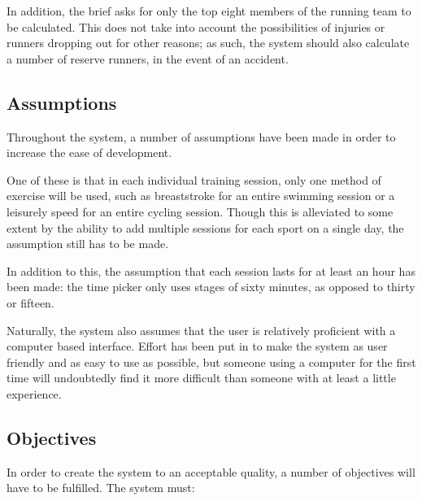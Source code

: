 \documentclass{article}[12pt,a4paper]
\begin{document}
In addition, the brief asks for only the top eight members of the running team to be calculated. This does not take into account the possibilities of injuries or runners dropping out for other reasons; as such, the system should also calculate a number of reserve runners, in the event of an accident.

\subsection{Assumptions}
Throughout the system, a number of assumptions have been made in order to increase the ease of development. 

One of these is that in each individual training session, only one method of exercise will be used, such as breaststroke for an entire swimming session or a leisurely speed for an entire cycling session. Though this is alleviated to some extent by the ability to add multiple sessions for each sport on a single day, the assumption still has to be made. 

In addition to this, the assumption that each session lasts for at least an hour has been made: the time picker only uses stages of sixty minutes, as opposed to thirty or fifteen.

Naturally, the system also assumes that the user is relatively proficient with a computer based interface. Effort has been put in to make the system as user friendly and as easy to use as possible, but someone using a computer for the first time will undoubtedly find it more difficult than someone with at least a little experience.

\subsection{Objectives}
In order to create the system to an acceptable quality, a number of objectives will have to be fulfilled. The system must:
\end{document}
